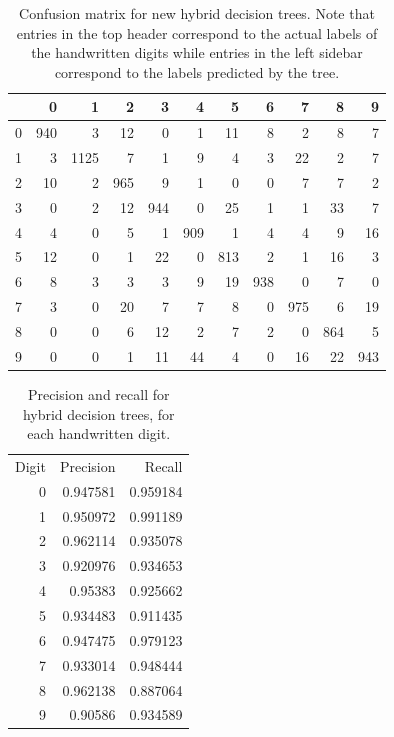 \begin{table}
	\begin{tabular}{r|rrrrrrrrrr}
		&   0 &    1 &   2 &   3 &   4 &   5 &   6 &   7 &   8 &   9 \\
		\hline
		0 & 940 &    3 &  12 &   0 &   1 &  11 &   8 &   2 &   8 &   7 \\
		1 &   3 & 1125 &   7 &   1 &   9 &   4 &   3 &  22 &   2 &   7 \\
		2 &  10 &    2 & 965 &   9 &   1 &   0 &   0 &   7 &   7 &   2 \\
		3 &   0 &    2 &  12 & 944 &   0 &  25 &   1 &   1 &  33 &   7 \\
		4 &   4 &    0 &   5 &   1 & 909 &   1 &   4 &   4 &   9 &  16 \\
		5 &  12 &    0 &   1 &  22 &   0 & 813 &   2 &   1 &  16 &   3 \\
		6 &   8 &    3 &   3 &   3 &   9 &  19 & 938 &   0 &   7 &   0 \\
		7 &   3 &    0 &  20 &   7 &   7 &   8 &   0 & 975 &   6 &  19 \\
		8 &   0 &    0 &   6 &  12 &   2 &   7 &   2 &   0 & 864 &   5 \\
		9 &   0 &    0 &   1 &  11 &  44 &   4 &   0 &  16 &  22 & 943 \\
	\end{tabular}
	\caption{Confusion matrix for new hybrid decision trees.  Note that entries in the top header correspond to the actual labels of the handwritten digits while entries in the left sidebar correspond to the labels predicted by the tree.}
	\label{table:with_kd_confusion}
\end{table}

\begin{table}
	\centering
	\begin{tabular}{rrr}
		\hline
		Digit &   Precision &   Recall \\
		0 &    0.947581 & 0.959184 \\
		1 &    0.950972 & 0.991189 \\
		2 &    0.962114 & 0.935078 \\
		3 &    0.920976 & 0.934653 \\
		4 &    0.95383  & 0.925662 \\
		5 &    0.934483 & 0.911435 \\
		6 &    0.947475 & 0.979123 \\
		7 &    0.933014 & 0.948444 \\
		8 &    0.962138 & 0.887064 \\
		9 &    0.90586  & 0.934589 \\
	\end{tabular}
	\caption{Precision and recall for hybrid decision trees, for each handwritten digit.}
	\label{table:with_kd_precision_recall}
\end{table}

